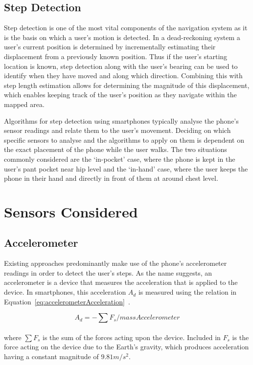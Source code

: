 \documentclass[main.tex]{subfiles}
\begin{document}
\subsection{Step Detection}

Step detection is one of the most vital components of the navigation system as it is the basis on which a user's motion is detected. In a dead-reckoning system a user's current position is determined by incrementally estimating their displacement from a previously known position. Thus if the user's starting location is known, step detection along with the user's bearing can be used to identify when they have moved and along which direction. Combining this with step length estimation allows for determining the magnitude of this displacement, which enables keeping track of the user's position as they navigate within the mapped area. 

Algorithms for step detection using smartphones typically analyse the phone's sensor readings and relate them to the user's movement. Deciding on which specific sensors to analyse and the algorithms to apply on them is dependent on the exact placement of the phone while the user walks. The two situations commonly considered are the `in-pocket' case, where the phone is kept in the user's pant pocket near hip level and the `in-hand' case, where the user keeps the phone in their hand and directly in front of them at around chest level. 

\section{Sensors Considered}

\subsection{Accelerometer}
Existing approaches predominantly make use of the phone's accelerometer readings in order to detect the user's steps. As the name suggests, an accelerometer is a device that measures the acceleration that is applied to the device. In smartphones, this acceleration $A_{d}$ is measured using the relation in 
Equation~\ref{eq:accelerometerAcceleration}~\cite{accelerometerAcceleration}.  

\begin{equation}\label{eq:accelerometerAcceleration}
A_{d} = - \sum F_{s}/massAccelerometer
\end{equation}
\\
where $\sum F_{s}$ is the sum of the forces acting upon the device. Included in $F_{s}$ is the force acting on the device due to the Earth's gravity, which produces acceleration having a constant magnitude of $9.81 m/s^2$. 
\end{document}
